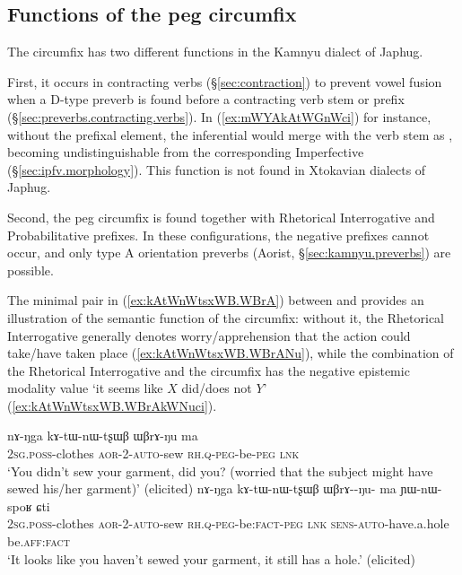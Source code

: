 \subsection{Functions of the peg circumfix}
The circumfix has two different functions in the Kamnyu dialect of Japhug.

First, it occurs in contracting verbs (§\ref{sec:contraction}) to prevent vowel fusion when a D-type preverb is found before a contracting verb stem or prefix (§\ref{sec:preverbs.contracting.verbs}). In (\ref{ex:mWYAkAtWGnWci}) for instance, without the  prefixal element, the inferential  would merge with the verb stem  as , becoming undistinguishable from the corresponding Imperfective  (§\ref{sec:ipfv.morphology}). This function is not found in Xtokavian dialects of Japhug.

Second, the peg circumfix is found together with Rhetorical Interrogative  and Probabilitative  prefixes.  In these configurations, the negative prefixes cannot occur, and only type A orientation preverbs (Aorist, §\ref{sec:kamnyu.preverbs}) are possible.

The minimal pair in (\ref{ex:kAtWnWtsxWB.WBrA}) between  and  provides an illustration of the semantic function of the circumfix: without it, the Rhetorical Interrogative generally denotes worry/apprehension that the action could take/have taken place (\ref{ex:kAtWnWtsxWB.WBrANu}), while the combination of the Rhetorical Interrogative and the circumfix has the negative epistemic modality value `it seems like $X$ did/does not $Y$' (\ref{ex:kAtWnWtsxWB.WBrAkWNuci}).
 
\begin{exe}
\ex \label{ex:kAtWnWtsxWB.WBrA}
\begin{xlist}
 \ex \label{ex:kAtWnWtsxWB.WBrANu}
\gll nɤ-ŋga kɤ-tɯ-nɯ-tʂɯβ ɯβrɤ-ŋu ma   \\
\textsc{2sg}.\textsc{poss}-clothes \textsc{aor}-2-\textsc{auto}-sew \textsc{rh}.\textsc{q}-\textsc{peg}-be-\textsc{peg} \textsc{lnk} \\
\glt `You didn't sew your garment, did you? (worried that the subject might have sewed his/her garment)' (elicited)
\ex \label{ex:kAtWnWtsxWB.WBrAkWNuci}
\gll nɤ-ŋga kɤ-tɯ-nɯ-tʂɯβ ɯβrɤ--ŋu- ma ɲɯ-nɯ-spoʁ ɕti \\
\textsc{2sg}.\textsc{poss}-clothes \textsc{aor}-2-\textsc{auto}-sew \textsc{rh}.\textsc{q}-\textsc{peg}-be:\textsc{fact}-\textsc{peg} \textsc{lnk} \textsc{sens}-\textsc{auto}-have.a.hole be.\textsc{aff}:\textsc{fact} \\
\glt `It looks like you haven't sewed your garment, it still has a hole.' (elicited)
\end{xlist}
\end{exe}

